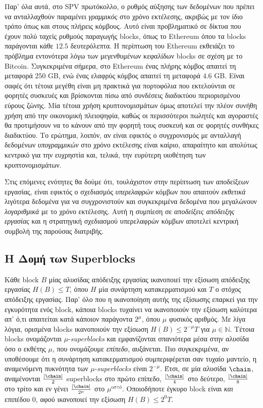 Παρ' όλα αυτά, στο SPV πρωτόκολλο,
ο ρυθμός αύξησης των δεδομένων που πρέπει να ανταλλαχθούν παραμένει \emph{γραμμικός} στο χρόνο εκτέλεσης,
ακριβώς με τον ίδιο τρόπο όπως και στους πλήρεις κόμβους. Αυτό είναι προβληματικό σε δίκτυα που έχουν πολύ ταχείς
ρυθμούς παραγωγής blocks, όπως το Ethereum όπου τα blocks παράγονται κάθε $12.5$ δευτερόλεπτα.
Η περίπτωση του Ethereum εκθειάζει το πρόβλημα εντονότερα λόγω των μεγενθυμένων κεφαλίδων blocks σε σχέση
με το Bitcoin. Συγκεκριμένα σήμερα, στο Ethereum ένας πλήρης κόμβος απαιτεί τη μεταφορά $250$ GB, ενώ ένας
ελαφρύς κόμβος απαιτεί τη μεταφορά $4.6$ GB. Είναι σαφές ότι τέτοια μεγέθη είναι μη πρακτικά για πορτοφόλια που
εκτελούνται σε φορητές συσκευές και βρίσκονται πίσω από συνδέσεις διαδικτύου περιορισμένου εύρους ζώνης.
Μία τέτοια χρήση κρυπτονομισμάτων όμως αποτελεί την πλέον συνήθη χρήση από την οικονομική πλειοψηφία,
καθώς οι περισσότεροι πωλητές και αγοραστές θα προτιμήσουν να το κάνουν
από την φορητή τους συσκευή και σε φορητές συνθήκες διαδικτύου. Το ερώτημα, λοιπόν, αν είναι εφικτός ο
συγχρονισμός με ανταλλαγή δεδομένων \emph{υπογραμμικών} στο χρόνο εκτέλεσης είναι καίριο, απαραίτητο και
απολύτως κεντρικό για την ευχρηστία και, τελικά, την ευρύτερη υιοθέτηση των κρυπτονομισμάτων.

Στις επόμενες ενότητες θα δούμε ότι, τουλάχιστον στην περίπτωση των αποδείξεων εργασίας,
είναι εφικτός ο σχεδιασμός \emph{υπερελαφρών} κόμβων που απαιτούν
\emph{εκθετικά} λιγότερα δεδομένα για να συγχρονιστούν και συγκεκριμένα δεδομένα που μεγαλώνουν
\emph{λογαριθμικά} με το χρόνο εκτέλεσης. Αυτή η συμπίεση σε \emph{αποδείξεις απόδειξης εργασίας}
και η στρατηγική σχεδιασμού υπερελαφρών κόμβων αποτελεί κεντρική συμβολή της παρούσας διατριβής.

\subsection*{Η Δομή των Superblocks}
Κάθε block $B$ μίας αλυσίδας απόδειξης εργασίας ικανοποιεί την εξίσωση απόδειξης εργασίας $H(B) \leq T$,
όπου $H$ μία συνάρτηση κατακερματισμού και $T$ ο στόχος απόδειξης εργασίας. Παρ' όλο που
η ικανοποίηση αυτής της εξίσωσης επαρκεί για την εγκυρότητα ενός block, κάποια blocks τυχαίνει να ικανοποιούν
την εξίσωση καλύτερα απ' ό,τι απαιτείται κατά κάποιον παράγοντα $2^\mu$, όπου $\mu$ φυσικός αριθμός. Με
λίγα λόγια, ορισμένα blocks ικανοποιούν την εξίσωση $H(B) \leq 2^{-\mu} T$ για $\mu \in \mathbb{N}$.
Τέτοια blocks ονομάζονται $\mu$-\emph{superblocks} και εμφανίζονται σπανιότερα μέσα στην αλυσίδα όσο ο εκθέτης
$\mu$, που ονομάζουμε \emph{επίπεδο}, αυξάνεται. Πιο συγκεκριμένα, αν υποθέσουμε ότι η συνάρτηση
κατακερματισμού συμπεριφέρεται σαν
τυχαίο μαντείο, η αναμενόμενη πυκνότητα των $\mu$-\emph{superblocks} είναι $2^{-\mu}$. Έτσι, σε μία αλυσίδα
$\chain$, αναμένονται $\frac{|\chain|}{2}$ superblocks στο πρώτο επίπεδο, $\frac{|\chain|}{4}$ στο
δεύτερο, $\frac{|\chain|}{8}$ στο τρίτο και εν γένει $\frac{|\chain|}{2^\mu}$ στο $\mu^\text{οστό}$.
Οποιοδήποτε έγκυρο block είναι \emph{και} επιπέδου $0$, αφού ικανοποιεί την εξίσωση $H(B) \leq 2^0 T$.

